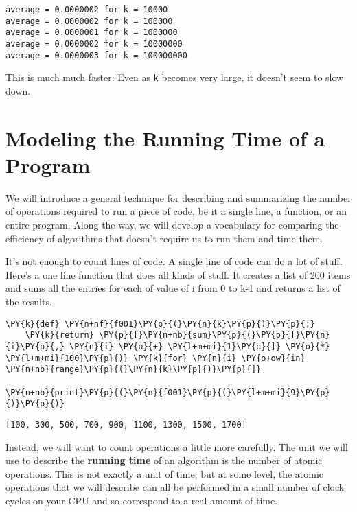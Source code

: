 \begin{Verbatim}
average = 0.0000002 for k = 10000
average = 0.0000002 for k = 100000
average = 0.0000001 for k = 1000000
average = 0.0000002 for k = 10000000
average = 0.0000003 for k = 100000000

\end{Verbatim}


This is much much faster.
Even as \texttt{k} becomes very large, it doesn't seem to slow down.

\section{Modeling the Running Time of a Program}


We will introduce a general technique for describing and summarizing the number of operations required to run a piece of code, be it a single line, a function, or an entire program.
Along the way, we will develop a vocabulary for comparing the efficiency of algorithms that doesn't require us to run them and time them.


It's not enough to count lines of code.
A single line of code can do a lot of stuff.
Here's a one line function that does all kinds of stuff.
It creates a list of 200 items and sums all the entries for each of value of i from 0 to k-1 and returns a list of the results.


\begin{Verbatim}[commandchars=\\\{\}]
\PY{k}{def} \PY{n+nf}{f001}\PY{p}{(}\PY{n}{k}\PY{p}{)}\PY{p}{:}
    \PY{k}{return} \PY{p}{[}\PY{n+nb}{sum}\PY{p}{(}\PY{p}{[}\PY{n}{i}\PY{p}{,} \PY{n}{i} \PY{o}{+} \PY{l+m+mi}{1}\PY{p}{]} \PY{o}{*} \PY{l+m+mi}{100}\PY{p}{)} \PY{k}{for} \PY{n}{i} \PY{o+ow}{in} \PY{n+nb}{range}\PY{p}{(}\PY{n}{k}\PY{p}{)}\PY{p}{]}

\PY{n+nb}{print}\PY{p}{(}\PY{n}{f001}\PY{p}{(}\PY{l+m+mi}{9}\PY{p}{)}\PY{p}{)}
\end{Verbatim}

\begin{Verbatim}
[100, 300, 500, 700, 900, 1100, 1300, 1500, 1700]

\end{Verbatim}


Instead, we will want to count operations a little more carefully.
The unit we will use to describe the \textbf{running time} of an algorithm is the number of atomic operations.
This is not exactly a unit of time, but at some level, the atomic operations that we will describe can all be performed in a small number of clock cycles on your CPU and so correspond to a real amount of time.


